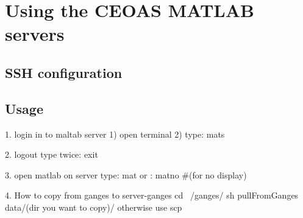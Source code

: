 \chapter{Using the CEOAS MATLAB servers}

\section{SSH configuration}

\section{Usage}

1. login in  to maltab server
   1) open terminal
   2) type: mats

2. logout
   type twice: exit

3. open matlab on server
   type: mat
   or  : matno    \#(for no display)

4. How to copy from ganges to server-ganges
	cd ~/ganges/
	sh pullFromGanges data/(dir you want to copy)/
        otherwise use scp

